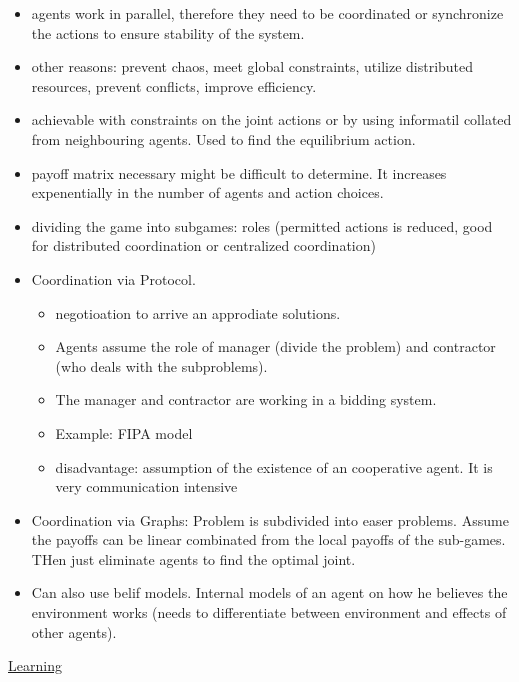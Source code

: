 \begin{itemize}[noitemsep,nolistsep]
	\item agents work in parallel, therefore they need to be coordinated or synchronize the actions to ensure stability of the system.
	\item other reasons: prevent chaos, meet global constraints, utilize distributed resources, prevent conflicts, improve efficiency.
	\item achievable with constraints on the joint actions or by using informatil collated from neighbouring agents. Used to find the equilibrium action.
	\item payoff matrix necessary might be difficult to determine. It increases expenentially in the number of agents and action choices.
	\item dividing the game into subgames: roles (permitted actions is reduced, good for distributed coordination or centralized coordination)
	\item Coordination via Protocol.
	\begin{itemize}[noitemsep,nolistsep]
		\item negotioation to arrive an approdiate solutions.
		\item Agents assume the role of manager (divide the problem) and contractor (who deals with the subproblems).
		\item The manager and contractor are working in a bidding system.
		\item Example: FIPA model
		\item disadvantage: assumption of the existence of an cooperative agent. It is very communication intensive
	\end{itemize}
	\item Coordination via Graphs: Problem is subdivided into easer problems. Assume the payoffs can be linear combinated from the local payoffs of the sub-games. THen just eliminate agents to find the optimal joint.
	\item Can also use belif models. Internal models of an agent on how he believes the environment works (needs to differentiate between environment and effects of other agents).
\end{itemize}
\underline{Learning}
